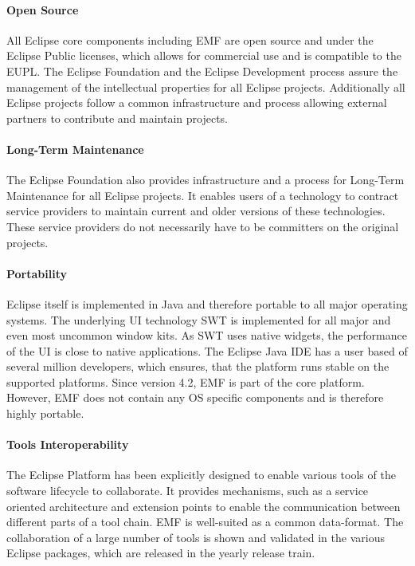 \paragraph {Open Source}
All Eclipse core components including EMF are open source and under
the Eclipse Public licenses, which allows for commercial use and is
compatible to the EUPL. The Eclipse Foundation and the Eclipse
Development process assure the management of the intellectual
properties for all Eclipse projects. Additionally all Eclipse projects
follow a common infrastructure and process allowing external partners
to contribute and maintain projects. 

\paragraph{Long-Term Maintenance}
The Eclipse Foundation also provides infrastructure and a process for
Long-Term Maintenance for all Eclipse projects. It enables users of a
technology to contract service providers to maintain current and older
versions of these technologies. These service providers do not
necessarily have to be committers on the original projects.

\paragraph{Portability}
Eclipse itself is implemented in Java and therefore portable to all
major operating systems. The underlying UI technology SWT is
implemented for all major and even most uncommon window kits. As SWT
uses native widgets, the performance of the UI is close to native
applications. The Eclipse Java IDE has a user based of several million
developers, which ensures, that the platform runs stable on the
supported platforms. Since version 4.2, EMF is part of the core
platform. However, EMF does not contain any OS specific components and
is therefore highly portable.

\paragraph{Tools Interoperability}
The Eclipse Platform has been explicitly designed to enable various
tools of the software lifecycle to collaborate. It provides
mechanisms, such as a service oriented architecture and extension
points to enable the communication between different parts of a tool
chain. EMF is well-suited as a common data-format. The collaboration
of a large number of tools is shown and validated in the various
Eclipse packages, which are released in the yearly release train.

